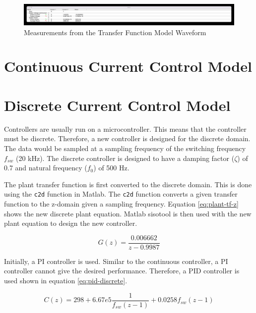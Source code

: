 \documentclass[12pt]{article}
\begin{document}
\begin{figure}[ht]
    \centering{}
    \includegraphics[width=\textwidth, height=0.4\textheight, keepaspectratio]{img/Transfer Function Cursor.jpg}
    \caption{Measurements from the Transfer Function Model Waveform}
    \label{fig:tf-cursor}
\end{figure}

\section{Continuous Current Control Model}
\label{sec:cont-cc-model}

\section{Discrete Current Control Model}

Controllers are usually run on a microcontroller.
This means that the controller must be discrete.
Therefore, a new controller is designed for the discrete domain.
The data would be sampled at a sampling frequency of the switching frequency $f_{sw}$ (20 kHz).
The discrete controller is designed to have a damping factor ($\zeta$) of 0.7 and natural frequency ($f_0$) of 500 Hz.

The plant transfer function is first converted to the discrete domain.
This is done using the \lstinline{c2d} function in Matlab.
The \lstinline{c2d} function converts a given transfer function to the z-domain given a sampling frequency.
Equation \ref{eq:plant-tf-z} shows the new discrete plant equation.
Matlab sisotool is then used with the new plant equation to design the new controller.

\begin{equation} \label{eq:plant-tf-z}
    G(z) = \frac{0.006662}{z - 0.9987}
\end{equation}

Initially, a PI controller is used.
Similar to the continuous controller, a PI controller cannot give the desired performance.
Therefore, a PID controller is used shown in equation \ref{eq:pid-discrete}.

\begin{equation} \label{eq:pid-discrete}
    C(z) = 298 + 6.67e5 \frac{1}{f_{sw} (z - 1)} + 0.0258 f_{sw} (z - 1)
\end{equation}
\end{document}
